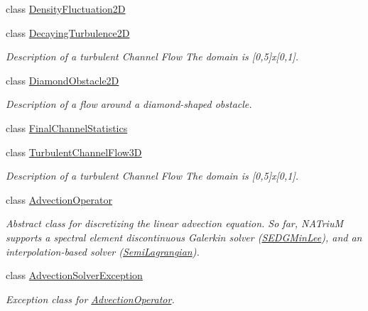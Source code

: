 \begin{DoxyCompactItemize}
class \hyperlink{classnatrium_1_1DensityFluctuation2D}{DensityFluctuation2D}
\item 
class \hyperlink{classnatrium_1_1DecayingTurbulence2D}{DecayingTurbulence2D}
\begin{DoxyCompactList}\small\item\em Description of a turbulent Channel Flow The domain is \mbox{[}0,5\mbox{]}x\mbox{[}0,1\mbox{]}. \item\end{DoxyCompactList}\item 
class \hyperlink{classnatrium_1_1DiamondObstacle2D}{DiamondObstacle2D}
\begin{DoxyCompactList}\small\item\em Description of a flow around a diamond-\/shaped obstacle. \item\end{DoxyCompactList}\item 
class \hyperlink{classnatrium_1_1FinalChannelStatistics}{FinalChannelStatistics}
\item 
class \hyperlink{classnatrium_1_1TurbulentChannelFlow3D}{TurbulentChannelFlow3D}
\begin{DoxyCompactList}\small\item\em Description of a turbulent Channel Flow The domain is \mbox{[}0,5\mbox{]}x\mbox{[}0,1\mbox{]}. \item\end{DoxyCompactList}\item 
class \hyperlink{classnatrium_1_1AdvectionOperator}{AdvectionOperator}
\begin{DoxyCompactList}\small\item\em Abstract class for discretizing the linear advection equation. So far, NATriuM supports a spectral element discontinuous Galerkin solver (\hyperlink{classnatrium_1_1SEDGMinLee}{SEDGMinLee}), and an interpolation-\/based solver (\hyperlink{classnatrium_1_1SemiLagrangian}{SemiLagrangian}). \item\end{DoxyCompactList}\item 
class \hyperlink{classnatrium_1_1AdvectionSolverException}{AdvectionSolverException}
\begin{DoxyCompactList}\small\item\em Exception class for \hyperlink{classnatrium_1_1AdvectionOperator}{AdvectionOperator}. \item\end{DoxyCompactList}\item 

\end{DoxyCompactItemize}

